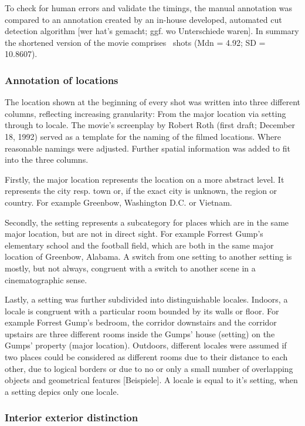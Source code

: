 \documentclass[10pt,a4paper,twocolumn]{article}
\begin{document}
To check for human errors and validate the timings, the manual annotation
was compared to an annotation created by an in-house developed, automated
cut detection algorithm {[}wer hat's gemacht; ggf. wo Unterschiede
waren{]}. In summary the shortened version of the movie comprises
\NShots\ shots (Mdn = 4.92; SD = 10.8607).


\subsubsection{Annotation of locations}

The location shown at the beginning of every shot was written into
three different columns, reflecting increasing granularity: From the
major location via setting through to locale. The movie's screenplay
by Robert Roth (first draft; December 18, 1992) served as a template
for the naming of the filmed locations. Where reasonable namings were
adjusted. Further spatial information was added to fit into the three
columns.

Firstly, the major location represents the location on a more abstract
level. It represents the city resp. town or, if the exact city is
unknown, the region or country. For example Greenbow, Washington D.C.
or Vietnam. 

Secondly, the setting represents a subcategory for places which are
in the same major location, but are not in direct sight. For example
Forrest Gump's elementary school and the football field, which are
both in the same major location of Greenbow, Alabama. A switch from
one setting to another setting is mostly, but not always, congruent
with a switch to another scene in a cinematographic sense.

Lastly, a setting was further subdivided into distinguishable locales.
Indoors, a locale is congruent with a particular room bounded by its
walls or floor. For example Forrest Gump's bedroom, the corridor downstairs
and the corridor upstairs are three different rooms inside the Gumps'
house (setting) on the Gumps' property (major location). Outdoors,
different locales were assumed if two places could be considered as
different rooms due to their distance to each other, due to logical
borders or due to no or only a small number of overlapping objects
and geometrical features {[}Beispiele{]}. A locale is equal to it's
setting, when a setting depics only one locale. 


\subsubsection{Interior exterior distinction }
\end{document}
